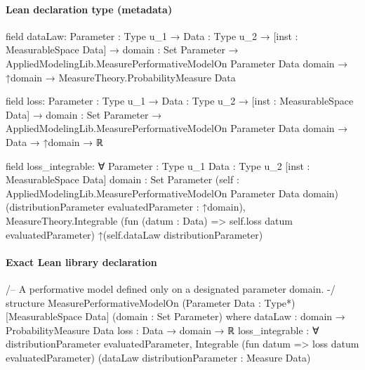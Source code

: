 \documentclass[10pt]{article}
\begin{document}
\paragraph{Lean declaration type (metadata)}
\begin{ReviewVerbatim}
field dataLaw:
{Parameter : Type u_1} →
  {Data : Type u_2} →
    [inst : MeasurableSpace Data] →
      {domain : Set Parameter} →
        AppliedModelingLib.MeasurePerformativeModelOn Parameter Data domain →
          ↑domain → MeasureTheory.ProbabilityMeasure Data

field loss:
{Parameter : Type u_1} →
  {Data : Type u_2} →
    [inst : MeasurableSpace Data] →
      {domain : Set Parameter} →
        AppliedModelingLib.MeasurePerformativeModelOn Parameter Data domain → Data → ↑domain → ℝ

field loss_integrable:
∀ {Parameter : Type u_1} {Data : Type u_2} [inst : MeasurableSpace Data] {domain : Set Parameter}
  (self : AppliedModelingLib.MeasurePerformativeModelOn Parameter Data domain)
  (distributionParameter evaluatedParameter : ↑domain),
  MeasureTheory.Integrable (fun (datum : Data) => self.loss datum evaluatedParameter)
    ↑(self.dataLaw distributionParameter)
\end{ReviewVerbatim}

\paragraph{Exact Lean library declaration}
\begin{ReviewVerbatim}
/-- A performative model defined only on a designated parameter domain. -/
structure MeasurePerformativeModelOn (Parameter Data : Type*) [MeasurableSpace Data]
    (domain : Set Parameter) where
  dataLaw : domain → ProbabilityMeasure Data
  loss : Data → domain → ℝ
  loss_integrable : ∀ distributionParameter evaluatedParameter,
    Integrable (fun datum => loss datum evaluatedParameter)
      (dataLaw distributionParameter : Measure Data)
\end{ReviewVerbatim}
\end{document}

